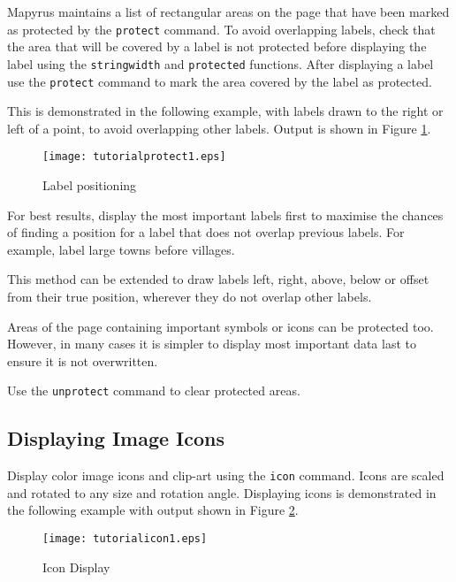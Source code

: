 Mapyrus maintains a list of rectangular
areas on the page that have been marked as protected by the
\texttt{protect} command.
To avoid overlapping labels, check that the area that will be
covered by a label is not protected before displaying the
label using the \texttt{stringwidth} and \texttt{protected} functions.
After displaying a label use the \texttt{protect} command to mark
the area covered by the label as protected.

This is demonstrated in the following example, with labels
drawn to the right or left of a point, to avoid overlapping
other labels.
Output is shown in Figure \ref{tutorialprotect1}.



\begin{figure}[htb]
\texttt{[image: tutorialprotect1.eps]}
\caption{Label positioning}
\label{tutorialprotect1}
\end{figure}

For best results, display the most important labels first to maximise the
chances of finding a position for a label that does not overlap previous
labels.  For example, label large towns before villages.

This method can be extended to draw labels left, right, above, below or offset
from their true position, wherever they do not overlap other labels.

Areas of the page containing important symbols or icons can be
protected too.  However, in many cases it is simpler to
display most important data last to ensure it is not overwritten.

Use the \texttt{unprotect} command to clear protected areas.

\subsection{Displaying Image Icons}
\label{icons}

Display color image icons and clip-art using the \texttt{icon} command.
Icons are scaled and rotated to any size and rotation angle.
Displaying icons is demonstrated in the following example
with output shown in Figure \ref{tutorialicon1}.



\begin{figure}[htb]
\texttt{[image: tutorialicon1.eps]}
\caption{Icon Display}
\label{tutorialicon1}
\end{figure}

